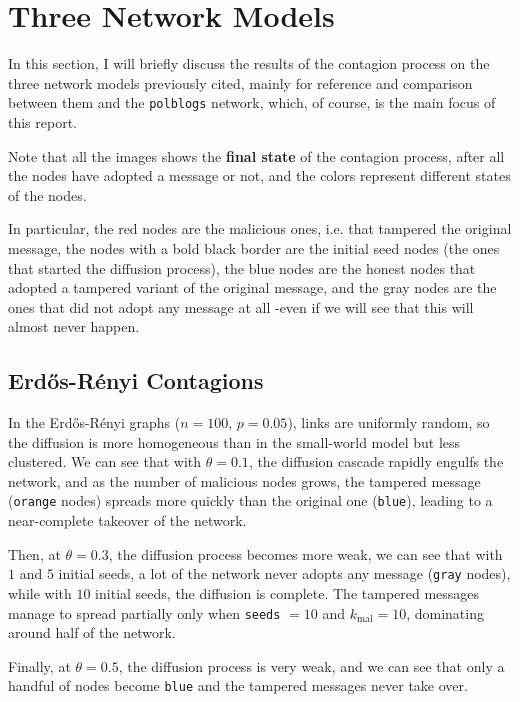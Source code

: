 \documentclass{article}
\begin{document}
\section{Three Network Models}\label{sec:three-networks} %
In this section, I will briefly discuss the results of the contagion process on the three network models previously cited, mainly for reference and comparison between them and the \texttt{polblogs} network, which, of course, is the main focus of this report.

Note that all the images shows the \textbf{final state} of the contagion process, after all the nodes have adopted a message or not, and the colors represent different states of the nodes.

In particular, the red nodes are the malicious ones, i.e. that tampered the original message, the nodes with a bold black border are the initial seed nodes (the ones that started the diffusion process), the blue nodes are the honest nodes that adopted a tampered variant of the original message, and the gray nodes are the ones that did not adopt any message at all -even if we will see that this will almost never happen.

\subsection{Erd\H{o}s-R\'enyi Contagions} %
In the Erd\H{o}s-R\'enyi graphs ($n=100$, $p=0.05$), links are uniformly random, so the diffusion is more homogeneous than in the small-world model but less clustered.
We can see that with $\theta=0.1$, the diffusion cascade rapidly engulfs the network, and as the number of malicious nodes grows, the tampered message (\texttt{orange} nodes) spreads more quickly than the original one (\texttt{blue}), leading to a near-complete takeover of the network. 

Then, at $\theta=0.3$, the diffusion process becomes more weak, we can see that with $1$ and $5$ initial seeds, a lot of the network never adopts any message (\texttt{gray} nodes), while with $10$ initial seeds, the diffusion is complete.
The tampered messages manage to spread partially only when \texttt{seeds} $=10$ and $k_\text{mal}=10$, dominating around half of the network.

Finally, at $\theta=0.5$, the diffusion process is very weak, and we can see that only a handful of nodes become \texttt{blue} and the tampered messages never take over.
\end{document}
